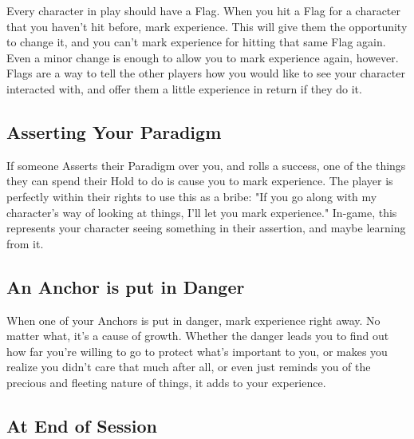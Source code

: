 \documentclass[
  oneside,
  statementpaper,
  9pt]{memoir}
\begin{document}
\begin{Player}

Every character in play should have a Flag. When you hit a Flag for a character that you haven’t hit before, mark experience. This will give them the opportunity to change it, and you can’t mark experience for hitting that same Flag again. Even a minor change is enough to allow you to mark experience again, however. Flags are a way to tell the other players how you would like to see your character interacted with, and offer them a little experience in return if they do it.

\end{Player}

\hypertarget{asserting-your-paradigm}{%
\subsection{Asserting Your Paradigm}\label{asserting-your-paradigm}}

\begin{Player}

If someone Asserts their Paradigm over you, and rolls a success, one of the things they can spend their Hold to do is cause you to mark experience. The player is perfectly within their rights to use this as a bribe: "If you go along with my character’s way of looking at things, I’ll let you mark experience." In-game, this represents your character seeing something in their assertion, and maybe learning from it.

\end{Player}

\hypertarget{an-anchor-is-put-in-danger}{%
\subsection{An Anchor is put in
Danger}\label{an-anchor-is-put-in-danger}}

\begin{Player}

When one of your Anchors is put in danger, mark experience right away. No matter what, it’s a cause of growth. Whether the danger leads you to find out how far you’re willing to go to protect what’s important to you, or makes you realize you didn’t care that much after all, or even just reminds you of the precious and fleeting nature of things, it adds to your experience.

\end{Player}

\hypertarget{at-end-of-session}{%
\subsection{At End of Session}\label{at-end-of-session}}
\end{document}
